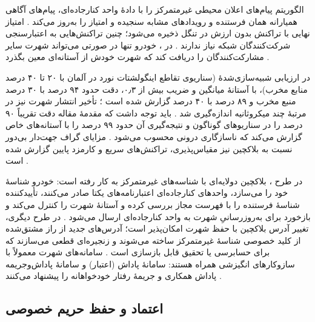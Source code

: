 الگوریتم  پیام‌های اعلان محیطی غیرمتمرکز را با دادهٔ واحد کنارجاده‌ای، پیام‌های آگاهی همیارانه همان فرستنده و رویدادهای مشابه سنجیده و امتیاز را به‌روز می‌کند \cite{feraudoDIVADIDbasedReputation2024}. امتیاز نهایی با تراکنش بدون ارزش در تنگل ذخیره می‌شود؛ چنین تراکنش‌هایی به اعتبارسنجی شرکت‌کنندگان شبکه نیاز ندارند \cite{feraudoDIVADIDbasedReputation2024}. در ، خودرو تنها در صورتی می‌تواند شهرت سایر مشارکت‌کنندگان را دریافت کند که شهرت خودش از آستانه‌ای معین بگذرد \cite{feraudoDIVADIDbasedReputation2024}.

در ارزیابی شبیه‌سازی‌شدهٔ  (سناریوی تقاطع اینگولشتات نورد در آلمان با ۲۰ تا ۴۰ درصد منابع مخرب)، با آستانهٔ میانگین و ضریب  بیش از ۰٫۳، دقت حدود ۹۴ درصد با ۳۰ درصد منبع مخرب و ۸۹ درصد با ۴۰ درصد گزارش شده است \cite{feraudoDIVADIDbasedReputation2024}؛ تأخیر انتشار شهرت نیز در مرتبهٔ چند میکروثانیه اندازه‌گیری شد \cite{feraudoDIVADIDbasedReputation2024}. باید توجه داشت که مقدمهٔ مقاله دقت تقریباً ۹۰ درصد را در سناریوهای گوناگون و نتیجه‌گیری آن حدود ۹۹ درصد را با آستانه‌های خاص گزارش می‌کند که ناسازگاری درونی محسوب می‌شود \cite{feraudoDIVADIDbasedReputation2024}. مزایای گراف جهت‌دار بی‌دور نسبت به بلاکچین نیز مقیاس‌پذیری، تراکنش‌های سریع و کارمزد پایین گزارش شده است \cite{feraudoDIVADIDbasedReputation2024}.

در طرح ، بلاکچین دولایه‌ای با شناسه‌های غیرمتمرکز به کار رفته است: خودرو شناسهٔ خود را می‌سازد، واحدهای کنارجاده‌ای اعتبارنامه‌های یکتا صادر می‌کنند، تأییدکننده شناسهٔ فرستنده را با فهرست مجاز بررسی کرده و آستانهٔ شهرت را کنترل می‌کند و بازخورد برای به‌روزرسانیِ شهرت به واحد کنارجاده‌ای ارسال می‌شود \cite{mazzocca2025survey}. در طرح دیگری، تغییر آدرس بلاکچین با حفظ شهرت امکان‌پذیر است؛ آدرس‌های جدید از راز مشتق‌شده از کلید خصوصی شناسهٔ غیرمتمرکز ساخته می‌شوند و زنجیره‌ای قطعی می‌سازند که برای حسابرسی یا تحقیق قابل بازسازی است \cite{mazzocca2025survey}. سامانه‌های شهرت معمولاً با سازوکارهای انگیزشی همراه هستند: سامانهٔ پاداش (اعتبار) و سامانهٔ پاداش‌و‌جریمه پاداش همکاری و جریمهٔ رفتار خودخواهانه را پیشنهاد می‌کنند \cite{farsimadanReviewSecurityChallenges2025}.

\subsection{اعتماد و حفظ حریم خصوصی}

